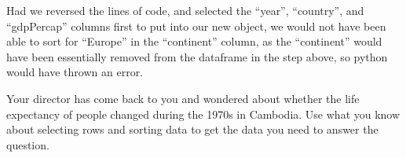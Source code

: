 \documentclass[
  letterpaper,
  DIV=11,
  numbers=noendperiod]{scrreprt}
\begin{document}
Had we reversed the lines of code, and selected the ``year'',
``country'', and ``gdpPercap'' columns first to put into our new object,
we would not have been able to sort for ``Europe'' in the ``continent''
column, as the ``continent'' would have been essentially removed from
the dataframe in the step above, so python would have thrown an error.

\begin{tcolorbox}[enhanced jigsaw, colframe=quarto-callout-warning-color-frame, toprule=.15mm, colback=white, leftrule=.75mm, rightrule=.15mm, breakable, colbacktitle=quarto-callout-warning-color!10!white, arc=.35mm, bottomtitle=1mm, bottomrule=.15mm, titlerule=0mm, title={Challenge 3}, toptitle=1mm, left=2mm, opacityback=0, coltitle=black, opacitybacktitle=0.6]
Your director has come back to you and wondered about whether the life
expectancy of people changed during the 1970s in Cambodia. Use what you
know about selecting rows and sorting data to get the data you need to
answer the question.
\end{tcolorbox}
\end{document}
